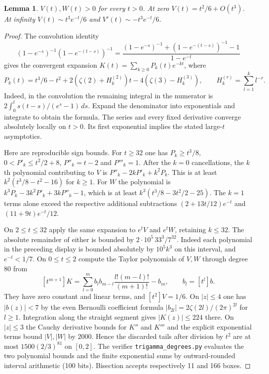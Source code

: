 \documentclass[11pt,a4paper]{article}
\newtheorem{lemma}[theorem]{Lemma}
\numberwithin{equation}{section}
\begin{document}
\begin{lemma}\label{lem:degree-kernels}
$V(t),W(t)>0$ for every $t>0$. At zero $V(t)=t^2/6+O(t^3)$.
At infinity $V(t)\sim t^3e^{-t}/6$ and $V'(t)\sim-t^3e^{-t}/6$.
\end{lemma}
\begin{proof}
The convolution identity
\[
 (1-e^{-s})^{-1}(1-e^{-(t-s)})^{-1}
 =\frac{(1-e^{-s})^{-1}+(1-e^{-(t-s)})^{-1}-1}{1-e^{-t}}
\]
gives the convergent expansion $K(t)=\sum_{k\ge0}P_k(t)e^{-kt}$, where
\[
 P_k(t)=t^3/6-t^2+2(\zeta(2)+H_k^{(2)})t
                -4(\zeta(3)-H_k^{(3)}),\qquad
 H_k^{(r)}=\sum_{l=1}^k l^{-r}.
\]
Indeed, in the convolution the remaining integral in the numerator is
$2\int_0^t s(t-s)/(e^s-1)\,ds$. Expand the denominator into exponentials
and integrate to obtain the formula. The series and every fixed
derivative converge absolutely locally on $t>0$. Its first exponential
implies the stated large-$t$ asymptotics.

Here are reproducible sign bounds. For $t\ge32$ one has
$P_k\ge t^3/8$, $0<P'_k\le t^2/2+8$, $P''_k=t-2$ and $P'''_k=1$.
After the $k=0$ cancellations, the $k$th polynomial contributing to
$V$ is $P''_k-2kP'_k+k^2P_k$. This is at least
$k^2(t^3/8-t^2-16)$ for $k\ge1$. For $W$ the polynomial is
$k^3P_k-3k^2P'_k+3kP''_k-1$, which is at least
$k^3(t^3/8-3t^2/2-25)$. The $k=1$ terms alone exceed the respective
additional subtractions $(2+13t/12)e^{-t}$ and $(11+9t)e^{-t}/12$.

On $2\le t\le32$ apply the same expansion to $e^t V$ and $e^t W$,
retaining $k\le32$. The absolute remainder of either is bounded by
$2\cdot10^5\,33^3/7^{32}$. Indeed each polynomial in the preceding
display is bounded absolutely by $10^5 k^3$ on this interval, and
$e^{-t}<1/7$. On $0\le t\le2$ compute the Taylor polynomials of
$V,W$ through degree $80$ from
\[
 [t^{m+1}]K=\sum_{l=0}^m b_l b_{m-l}\frac{l!(m-l)!}{(m+1)!}-b_m,
 \qquad b_l=[t^l]b.
\]
They have zero constant and linear terms, and $[t^2]V=1/6$. On
$|z|\le4$ one has $|b(z)|<7$ by the even Bernoulli coefficient formula
$|b_{2l}|=2\zeta(2l)/(2\pi)^{2l}$ for $l\ge1$. Integration along the
straight segment gives $|K(z)|\le224$ there. On $|z|\le3$ the Cauchy
derivative bounds for $K''$ and $K'''$ and the explicit exponential
terms bound $|V|,|W|$ by $2000$. Hence the discarded tails after
division by $t^2$ are at most $1500(2/3)^{81}$ on $[0,2]$.
The verifier \texttt{trigamma\_degrees.py} evaluates the two polynomial
bounds and the finite exponential sums by outward-rounded interval
arithmetic (100 bits). Bisection accepts respectively 11 and 166 boxes.
\end{proof}
\end{document}
